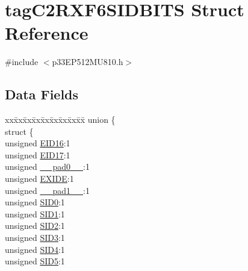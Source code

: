 \hypertarget{structtag_c2_r_x_f6_s_i_d_b_i_t_s}{}\section{tag\+C2\+R\+X\+F6\+S\+I\+D\+B\+I\+TS Struct Reference}
\label{structtag_c2_r_x_f6_s_i_d_b_i_t_s}


{\ttfamily \#include $<$p33\+E\+P512\+M\+U810.\+h$>$}

\subsection*{Data Fields}
\begin{DoxyCompactItemize}
\item 
\begin{tabbing}
xx\=xx\=xx\=xx\=xx\=xx\=xx\=xx\=xx\=\kill
union \{\\
\>struct \{\\
\>\>unsigned \hyperlink{structtag_c2_r_x_f6_s_i_d_b_i_t_s_a6dd5663b0c9838c56db040560ca0efa1}{EID16}:1\\
\>\>unsigned \hyperlink{structtag_c2_r_x_f6_s_i_d_b_i_t_s_aa648615464b0eb29967529333eee9fd9}{EID17}:1\\
\>\>unsigned \hyperlink{structtag_c2_r_x_f6_s_i_d_b_i_t_s_adf71f3d8410c1f1dbbc96680a92c49af}{\_\_pad0\_\_}:1\\
\>\>unsigned \hyperlink{structtag_c2_r_x_f6_s_i_d_b_i_t_s_a09ff1c1be3927220bd3dfbc10edfe243}{EXIDE}:1\\
\>\>unsigned \hyperlink{structtag_c2_r_x_f6_s_i_d_b_i_t_s_acaf2d0924a107ec6e8d2e31febaf66f9}{\_\_pad1\_\_}:1\\
\>\>unsigned \hyperlink{structtag_c2_r_x_f6_s_i_d_b_i_t_s_a1ca276ac15df60e1f7b9a6d0011ade93}{SID0}:1\\
\>\>unsigned \hyperlink{structtag_c2_r_x_f6_s_i_d_b_i_t_s_a3405d354f81391f879648f69f504dfc8}{SID1}:1\\
\>\>unsigned \hyperlink{structtag_c2_r_x_f6_s_i_d_b_i_t_s_ad744966dfc49307f731b7045b01b94e5}{SID2}:1\\
\>\>unsigned \hyperlink{structtag_c2_r_x_f6_s_i_d_b_i_t_s_a9345f3e64720be93e83d8dfc827f3f45}{SID3}:1\\
\>\>unsigned \hyperlink{structtag_c2_r_x_f6_s_i_d_b_i_t_s_aefb106fed4bb40e2c3c71ac612c554e3}{SID4}:1\\
\>\>unsigned \hyperlink{structtag_c2_r_x_f6_s_i_d_b_i_t_s_a0f221b3c9612231686bf87ccdcec8489}{SID5}:1\\

\end{tabbing}
\end{DoxyCompactItemize}
